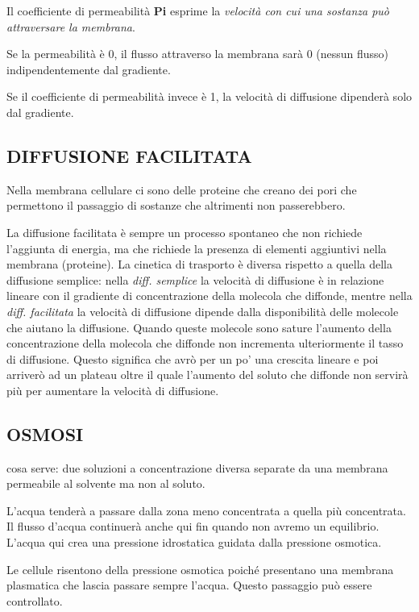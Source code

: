 \documentclass[]{article}
\begin{document}
Il coefficiente di permeabilità \textbf{Pi} esprime la \emph{velocità
con cui una sostanza può attraversare la membrana}.

Se la permeabilità è 0, il flusso attraverso la membrana sarà 0 (nessun
flusso) indipendentemente dal gradiente.

Se il coefficiente di permeabilità invece è 1, la velocità di diffusione
dipenderà solo dal gradiente.

\subsection{DIFFUSIONE FACILITATA}\label{diffusione-facilitata}

Nella membrana cellulare ci sono delle proteine che creano dei pori che
permettono il passaggio di sostanze che altrimenti non passerebbero.

La diffusione facilitata è sempre un processo spontaneo che non richiede
l'aggiunta di energia, ma che richiede la presenza di elementi
aggiuntivi nella membrana (proteine). La cinetica di trasporto è diversa
rispetto a quella della diffusione semplice: nella \emph{diff. semplice}
la velocità di diffusione è in relazione lineare con il gradiente di
concentrazione della molecola che diffonde, mentre nella \emph{diff.
facilitata} la velocità di diffusione dipende dalla disponibilità delle
molecole che aiutano la diffusione. Quando queste molecole sono sature
l'aumento della concentrazione della molecola che diffonde non
incrementa ulteriormente il tasso di diffusione. Questo significa che
avrò per un po' una crescita lineare e poi arriverò ad un plateau oltre
il quale l'aumento del soluto che diffonde non servirà più per aumentare
la velocità di diffusione.

\subsection{OSMOSI}\label{osmosi}

cosa serve: due soluzioni a concentrazione diversa separate da una
membrana permeabile al solvente ma non al soluto.

L'acqua tenderà a passare dalla zona meno concentrata a quella più
concentrata. Il flusso d'acqua continuerà anche qui fin quando non
avremo un equilibrio. L'acqua qui crea una pressione idrostatica guidata
dalla pressione osmotica.

Le cellule risentono della pressione osmotica poiché presentano una
membrana plasmatica che lascia passare sempre l'acqua. Questo passaggio
può essere controllato.
\end{document}
